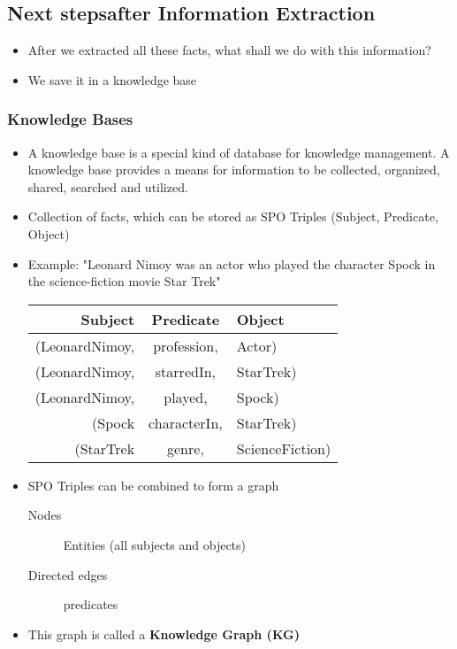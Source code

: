 		\subsection{Next stepsafter Information Extraction} %
			\begin{itemize}
				\item After we extracted all these facts, what shall we do with this information?
				\item We save it in a knowledge base
			\end{itemize}
		
			\subsubsection{Knowledge Bases}
				\begin{itemize}
					\item A knowledge base is a special kind of database for knowledge management. A knowledge base provides a means for information to be collected, organized, shared, searched and utilized. 
					\item Collection of facts, which can be stored as SPO Triples (Subject, Predicate, Object)
					\item Example: "Leonard Nimoy was an actor who played the character Spock in the science-fiction movie Star Trek"
						\begin{table}[H]
							\centering
							\begin{tabular}{r | c | l}
								\textbf{Subject}  	& \textbf{Predicate} 	& \textbf{Object} 	\\ \hline
								(LeonardNimoy,		& profession,	 		& Actor)			\\
								(LeonardNimoy,    	& starredIn,	 		& StarTrek)			\\
								(LeonardNimoy,    	& played,		 		& Spock)		    \\
								(Spock 	        	& characterIn,	 		& StarTrek)	        \\
								(StarTrek          	& genre,		 		& ScienceFiction)	\\
							\end{tabular}
						\end{table}
					\item SPO Triples can be combined to form a graph
						\begin{description}
							\item[Nodes] Entities (all subjects and objects)
							\item[Directed edges] predicates 
						\end{description}
					\item This graph is called a \textbf{Knowledge Graph (KG)}
				\end{itemize}
